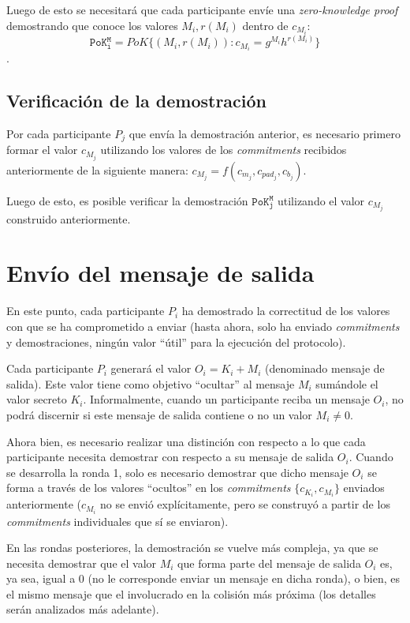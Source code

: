 Luego de esto se necesitará que cada participante envíe una 
\emph{zero-knowledge proof} demostrando que conoce los valores 
$M_i, r(M_i)$ dentro de $c_{M_i}$:
$$\mathtt{PoK_i^M} = PoK\{(M_i, r(M_i)) : c_{M_i} = g^{M_i} h^{r(M_i)}\}$$.

\subsection{Verificación de la demostración}

Por cada participante $P_j$ que envía la demostración anterior, es necesario 
primero formar el valor $c_{M_j}$ utilizando los valores de los 
\emph{commitments} recibidos anteriormente de la siguiente manera: 
$c_{M_j} = f(c_{m_j}, c_{pad_j}, c_{b_j})$.

Luego de esto, es posible verificar la demostración $\mathtt{PoK_j^M}$ 
utilizando el valor $c_{M_j}$ construido anteriormente.

\section{Envío del mensaje de salida}

En este punto, cada participante $P_i$ ha demostrado la correctitud de los 
valores con que se ha comprometido a enviar (hasta ahora, solo ha enviado 
\emph{commitments} y demostraciones, ningún valor ``útil'' para la ejecución 
del protocolo).

Cada participante $P_i$ generará el valor $O_i = K_i + M_i$ (denominado 
mensaje de salida). Este valor tiene como objetivo ``ocultar'' al mensaje $M_i$
sumándole el valor secreto $K_i$. Informalmente, cuando un participante reciba 
un mensaje $O_i$, no podrá discernir si este mensaje de salida contiene o no 
un valor $M_i \neq 0$.

Ahora bien, es necesario realizar una distinción con respecto a lo que cada 
participante necesita demostrar con respecto a su mensaje de salida $O_i$. 
Cuando se desarrolla la ronda 1, solo es necesario demostrar que dicho mensaje 
$O_i$ se forma a través de los valores ``ocultos'' en los \emph{commitments} 
$\{c_{K_i}, c_{M_i}\}$ enviados anteriormente ($c_{M_i}$ no se envió 
explícitamente, pero se construyó a partir de los \emph{commitments} 
individuales que sí se enviaron).

En las rondas posteriores, la demostración se vuelve más compleja, ya que se 
necesita demostrar que el valor $M_i$ que forma parte del mensaje de salida 
$O_i$ es, ya sea, igual a 0 (no le corresponde enviar un mensaje en dicha 
ronda), o bien, es el mismo mensaje que el involucrado en la colisión más 
próxima (los detalles serán analizados más adelante).

